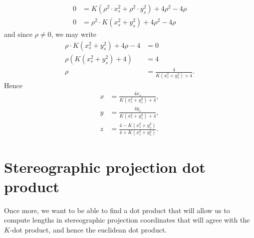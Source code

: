 \documentclass[newpage,hints,handout]{ximera}
\begin{document}
\begin{problem}
\begin{freeResponse}
\begin{align*}
      0 &= K\left(\rho^2\cdot x_s^2 + \rho^2\cdot y_s^2\right) + 4\rho^2-4\rho\\
      0 &= \rho^2\cdot K\left(x_s^2 + y_s^2\right) + 4\rho^2-4\rho
    \end{align*}
    and since $\rho \ne 0$, we may write
    \begin{align*}
      \rho\cdot K\left(x_s^2 + y_s^2\right) + 4\rho-4 &=0 \\
      \rho\left(K\left(x_s^2 + y_s^2\right) + 4\right) &=4\\
      \rho &= \frac{4}{K\left(x_s^2 + y_s^2\right) + 4}.
    \end{align*}
    Hence
    \begin{align*}
      x &= \frac{4x_s}{K\left(x_s^2 + y_s^2\right) + 4},\\
      y &= \frac{4y_s}{K\left(x_s^2 + y_s^2\right) + 4},\\
      z &= \frac{4-K\left(x_s^2 + y_s^2\right)}{4+K\left(x_s^2 + y_s^2\right)}.
    \end{align*}
  \end{freeResponse}
\end{problem}


\section{Stereographic projection dot product}

Once more, we want to be able to find a dot product that will allow us
to compute lengths in stereographic projection coordinates that will agree
with the $K$-dot product, and hence the euclidean dot product.
\end{document}
